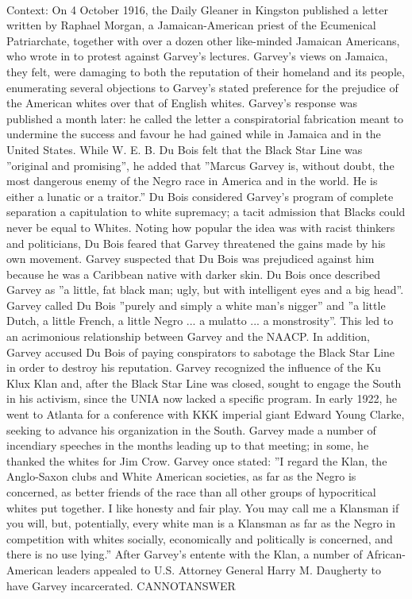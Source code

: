 \documentclass[11pt,a4paper, onecolumn]{article}
\begin{document}
\\ Context: On 4 October 1916, the Daily Gleaner in Kingston published a letter written by Raphael Morgan, a Jamaican-American priest of the Ecumenical Patriarchate, together with over a dozen other like-minded Jamaican Americans, who wrote in to protest against Garvey's lectures. Garvey's views on Jamaica, they felt, were damaging to both the reputation of their homeland and its people, enumerating several objections to Garvey's stated preference for the prejudice of the American whites over that of English whites. Garvey's response was published a month later: he called the letter a conspiratorial fabrication meant to undermine the success and favour he had gained while in Jamaica and in the United States. While W. E. B. Du Bois felt that the Black Star Line was ''original and promising'', he added that ''Marcus Garvey is, without doubt, the most dangerous enemy of the Negro race in America and in the world. He is either a lunatic or a traitor.'' Du Bois considered Garvey's program of complete separation a capitulation to white supremacy; a tacit admission that Blacks could never be equal to Whites. Noting how popular the idea was with racist thinkers and politicians, Du Bois feared that Garvey threatened the gains made by his own movement. Garvey suspected that Du Bois was prejudiced against him because he was a Caribbean native with darker skin. Du Bois once described Garvey as ''a little, fat black man; ugly, but with intelligent eyes and a big head''. Garvey called Du Bois ''purely and simply a white man's nigger'' and ''a little Dutch, a little French, a little Negro ... a mulatto ... a monstrosity''. This led to an acrimonious relationship between Garvey and the NAACP. In addition, Garvey accused Du Bois of paying conspirators to sabotage the Black Star Line in order to destroy his reputation. Garvey recognized the influence of the Ku Klux Klan and, after the Black Star Line was closed, sought to engage the South in his activism, since the UNIA now lacked a specific program. In early 1922, he went to Atlanta for a conference with KKK imperial giant Edward Young Clarke, seeking to advance his organization in the South. Garvey made a number of incendiary speeches in the months leading up to that meeting; in some, he thanked the whites for Jim Crow. Garvey once stated: ''I regard the Klan, the Anglo-Saxon clubs and White American societies, as far as the Negro is concerned, as better friends of the race than all other groups of hypocritical whites put together. I like honesty and fair play. You may call me a Klansman if you will, but, potentially, every white man is a Klansman as far as the Negro in competition with whites socially, economically and politically is concerned, and there is no use lying.'' After Garvey's entente with the Klan, a number of African-American leaders appealed to U.S. Attorney General Harry M. Daugherty to have Garvey incarcerated. CANNOTANSWER
\end{document}
